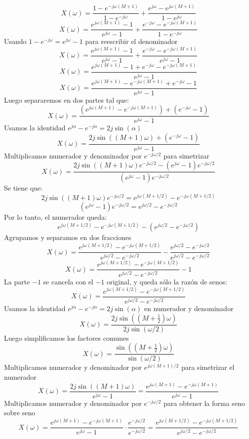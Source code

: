 \documentclass[
  11pt,
  letterpaper,
   addpoints,
   answers
  ]{exam}
\begin{document}
\begin{questions}
\begin{solution}
\[
X(\omega) = \frac{1-e^{-j\omega(M+1)}}{1-e^{-j\omega}} + \frac{e^{j\omega}-e^{j\omega(M+1)}}{1-e^{j\omega}}
\]
\[
X(\omega) = \frac{e^{j\omega(M+1)}-1}{e^{j\omega}-1} + \frac{e^{-j\omega}-e^{-j\omega(M+1)}}{1-e^{-j\omega}}
\]
Usando $1-e^{-j\omega} = e^{j\omega}-1$ para reescribir el denominador
\[
X(\omega) = \frac{e^{j\omega(M+1)}-1}{e^{j\omega}-1} + \frac{e^{-j\omega}-e^{-j\omega(M+1)}}{e^{j\omega}-1}
\]
\[
X(\omega) = \frac{e^{j\omega(M+1)}-1 + e^{-j\omega}-e^{-j\omega(M+1)}}{e^{j\omega}-1}
\]
\[
X(\omega) = \frac{e^{j\omega(M+1)}-e^{-j\omega(M+1)} + e^{-j\omega}-1}{e^{j\omega}-1}
\]
Luego separaremos en dos partes tal que:
\[
X(\omega) = \frac{\left(e^{j\omega(M+1)}-e^{-j\omega(M+1)}\right) + \left(e^{-j\omega}-1\right)}{e^{j\omega}-1}
\]
Usamos la identidad $e^{j\alpha}-e^{-j\alpha}=2j\sin(\alpha)$ 
\[
X(\omega) = \frac{2j\sin\left((M+1)\omega\right) + \left(e^{-j\omega}-1\right)}{e^{j\omega}-1}
\]
Multiplicamos numerador y denominador por $e^{-j\omega/2}$ para simetrizar
\[
X(\omega) = \frac{2j\sin\left((M+1)\omega\right)e^{-j\omega/2} - (e^{j\omega} - 1)e^{-j\omega/2}}{(e^{j\omega}-1)e^{-j\omega/2}}
\]
Se tiene que:
\[
2j\sin\left((M+1)\omega\right)e^{-j\omega/2} = e^{j\omega(M+1/2)} - e^{-j\omega(M+1/2)}
\]
\[
(e^{j\omega} - 1)e^{-j\omega/2} = e^{j\omega/2} - e^{-j\omega/2}
\]
Por lo tanto, el numerador queda:
\[
e^{j\omega(M+1/2)} - e^{-j\omega(M+1/2)} - (e^{j\omega/2} - e^{-j\omega/2})
\]
Agrupamos y separamos en dos fracciones
\[
X(\omega) = \frac{e^{j\omega(M+1/2)} - e^{-j\omega(M+1/2)}}{e^{j\omega/2} - e^{-j\omega/2}} - \frac{e^{j\omega/2} - e^{-j\omega/2}}{e^{j\omega/2} - e^{-j\omega/2}}
\]
\[
X(\omega) = \frac{e^{j\omega(M+1/2)} - e^{-j\omega(M+1/2)}}{e^{j\omega/2} - e^{-j\omega/2}} - 1
\]
La parte $-1$ se cancela con el $-1$ original, y queda sólo la razón de senos:
\[
X(\omega) = \frac{e^{j\omega(M+1/2)} - e^{-j\omega(M+1/2)}}{e^{j\omega/2} - e^{-j\omega/2}}
\]
Usamos la identidad $e^{j\alpha}-e^{-j\alpha}=2j\sin(\alpha)$ en numerador y denominador
\[
X(\omega) = \frac{2j\sin\left((M+\tfrac{1}{2})\omega\right)}{2j\sin(\omega/2)}
\]
Luego simplificamos los factores comunes
\[
X(\omega) = \frac{\sin\left((M+\tfrac{1}{2})\omega\right)}{\sin(\omega/2)}
\]
Multiplicamos numerador y denominador por $e^{j\omega(M+1)/2}$ para simetrizar el numerador
\[
X(\omega) = \frac{2j\sin\left((M+1)\omega\right)}{e^{j\omega}-1} = \frac{e^{j\omega(M+1)}-e^{-j\omega(M+1)}}{e^{j\omega}-1}
\]
Multiplicamos numerador y denominador por $e^{-j\omega/2}$ para obtener la forma seno sobre seno
\[
X(\omega) = \frac{e^{j\omega(M+1)}-e^{-j\omega(M+1)}}{e^{j\omega}-1} \cdot \frac{e^{-j\omega/2}}{e^{-j\omega/2}} = \frac{e^{j\omega(M+1/2)}-e^{-j\omega(M+1/2)}}{e^{j\omega/2}-e^{-j\omega/2}}
\]
\end{solution}
\end{questions}
\end{document}
